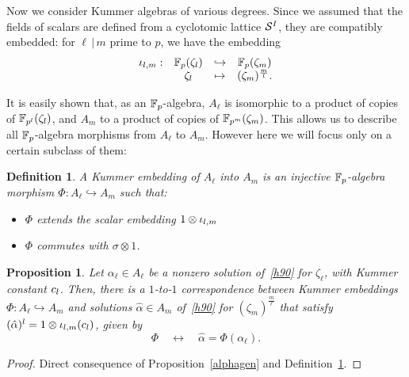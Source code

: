 \documentclass[sigconf]{acmart}
\newtheorem{proposition}[theorem]{Proposition}
\newtheorem{definition}[theorem]{Definition}
\begin{document}
Now we consider Kummer algebras of various degrees.
Since we assumed that the fields of scalars are defined from a cyclotomic lattice $\mathcal{S}^{I}$,
they are compatibly embedded:
for $\ell\,|\,m$ prime to $p$, we have the embedding
\[
\begin{array}{cccc}
  {\iota_{{l},{m}}}: & \mathbb{F}_{p}(\zeta_l) & \hookrightarrow & \mathbb{F}_{p}(\zeta_m) \\
  & \zeta_l & \mapsto & (\zeta_{m})^{\frac{m}{l}}.
\end{array}
\]

It is easily shown that, as an $\mathbb{F}_{p}$-algebra, $A_\ell$ is isomorphic to a product of copies of $\mathbb{F}_{p^l}(\zeta_l)$,
and $A_m$ to a product of copies of $\mathbb{F}_{p^m}(\zeta_m)$.
This allows us to describe all $\mathbb{F}_{p}$-algebra morphisms from $A_\ell$ to $A_m$. However here we will focus only on a certain
subclass of them:
\begin{definition}
\label{Kembedding}
A \emph{Kummer embedding} of $A_\ell$ into $A_m$ is an \emph{injective} $\mathbb{F}_{p}$-algebra morphism $\Phi:A_\ell\hookrightarrow A_m$
such that:
\begin{itemize}
\item $\Phi$ extends the scalar embedding $1\otimes{\iota_{{l},{m}}}$
\item $\Phi$ commutes with $\sigma\otimes1$.
\end{itemize}
\end{definition}

\begin{proposition}
\label{Phialpha}
Let $\alpha_\ell\in A_\ell$ be a nonzero solution of~\eqref{h90} for $\zeta_\ell$, with Kummer constant $c_l$.
Then, there is a $1$-to-$1$ correspondence between Kummer embeddings $\Phi:A_\ell\hookrightarrow A_m$ and solutions $\hat{\alpha}\in A_m$
of~\eqref{h90} for $(\zeta_m)^{\frac{m}{\ell}}$ that satisfy $(\hat{\alpha})^l=1\otimes{\iota_{{l},{m}}}(c_l)$,
given by \[ \Phi\quad\longleftrightarrow\quad\hat{\alpha}=\Phi(\alpha_\ell). \]
\end{proposition}
\begin{proof}
Direct consequence of Proposition~\ref{alphagen} and Definition~\ref{Kembedding}.
\end{proof}
\end{document}
